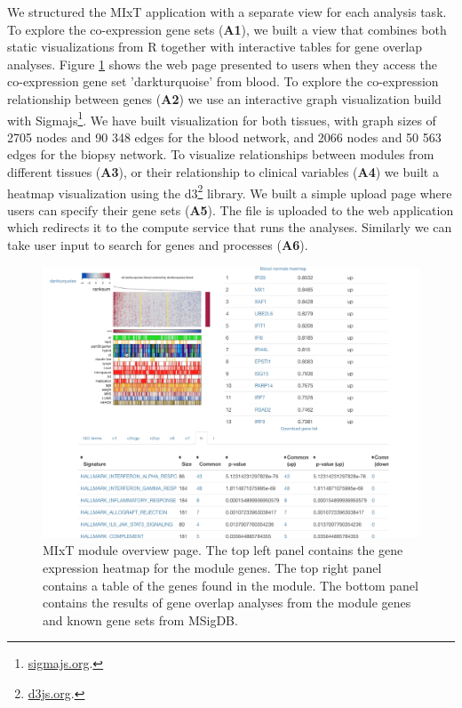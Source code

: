 We structured the MIxT application with a separate view for each analysis task.
To explore the co-expression gene sets (\textbf{A1}), we built a view that
combines both static visualizations from R together with interactive tables for
gene overlap analyses. Figure \ref{fig_first_case} shows the web page presented
to users when they access the co-expression gene set 'darkturquoise' from blood.
To explore the co-expression relationship between genes (\textbf{A2}) we use an
interactive graph visualization build with Sigmajs\footnote{\url{sigmajs.org}.}.
We have built visualization for both tissues, with graph sizes of 2705 nodes and
90 348 edges for the blood network, and 2066 nodes and 50 563 edges for the
biopsy network. 
To visualize relationships between modules from different tissues (\textbf{A3}),
or their relationship to clinical variables (\textbf{A4}) we built a heatmap
visualization using the d3\footnote{\url{d3js.org}.} library.  We built a simple
upload page where users can specify their gene sets
(\textbf{A5}). The file is uploaded to the web application which redirects it to
the compute service that runs the analyses. Similarly we can take user input to
search for genes and processes (\textbf{A6}).
\begin{figure}[h!]
\centering
\includegraphics[width=\columnwidth]{figures/module.png}
\caption{MIxT module overview page.
The top left panel
contains the gene expression heatmap for the module genes. The top right panel
contains a table of the genes found in the module. The bottom panel contains the
results of gene overlap analyses from the module genes and known gene sets from
MSigDB.}
\label{fig_first_case}
\end{figure} 

